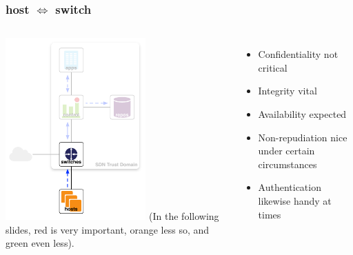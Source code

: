 \documentclass[t,handout]{beamer}
\begin{document}
\begin{frame}
\frametitle{host $\Longleftrightarrow$ switch}
\begin{columns}[T]
\includegraphics[height=2.75in]{ra-h-sw}
(In the following slides, {\color{red} red} is very important, {\color{orange} orange} less so, and {\color{green} green} even less).
\\~\\
\begin{itemize}
\item {\color{orange} Confidentiality not critical}
\item {\color{red} Integrity vital}
\item {\color{orange} Availability expected} 
\item {\color{green} Non-repudiation nice under certain circumstances}
\item {\color{green} Authentication likewise handy at times}
\end{itemize}
\end{columns}
\end{frame}
\end{document}
